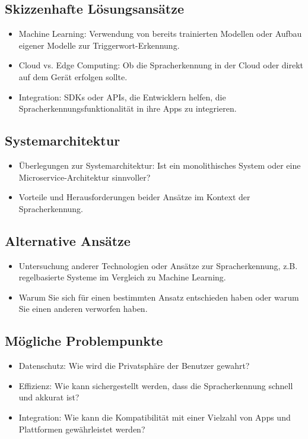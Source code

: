 \documentclass[11pt,a4paper]{article}
\begin{document}
\subsection{Skizzenhafte Lösungsansätze}
\begin{itemize}
	\item Machine Learning: Verwendung von bereits trainierten Modellen oder Aufbau eigener Modelle zur Triggerwort-Erkennung.
	\item Cloud vs. Edge Computing: Ob die Spracherkennung in der Cloud oder direkt auf dem Gerät erfolgen sollte.
	\item Integration: SDKs oder APIs, die Entwicklern helfen, die Spracherkennungsfunktionalität in ihre Apps zu integrieren.
\end{itemize}

\subsection{Systemarchitektur}
\begin{itemize}
	\item Überlegungen zur Systemarchitektur: Ist ein monolithisches System oder eine Microservice-Architektur sinnvoller?
	\item Vorteile und Herausforderungen beider Ansätze im Kontext der Spracherkennung.
\end{itemize}

\subsection{Alternative Ansätze}
\begin{itemize}
	\item Untersuchung anderer Technologien oder Ansätze zur Spracherkennung, z.B. regelbasierte Systeme im Vergleich zu Machine Learning.
	\item Warum Sie sich für einen bestimmten Ansatz entschieden haben oder warum Sie einen anderen verworfen haben.
\end{itemize}

\subsection{Mögliche Problempunkte}
\begin{itemize}
	\item Datenschutz: Wie wird die Privatsphäre der Benutzer gewahrt?
	\item Effizienz: Wie kann sichergestellt werden, dass die Spracherkennung schnell und akkurat ist?
	\item Integration: Wie kann die Kompatibilität mit einer Vielzahl von Apps und Plattformen gewährleistet werden?
\end{itemize}
\end{document}
